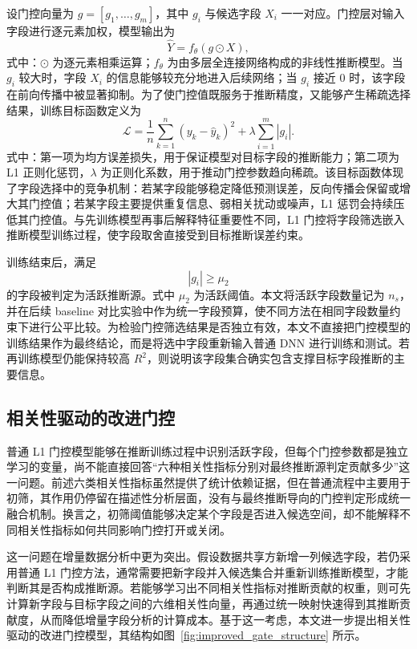 \documentclass[UTF8,zihao=5,twoside]{ctexart}
\numberwithin{equation}{section}
\begin{document}
设门控向量为 $g=[g_1,\ldots,g_m]$，其中 $g_i$ 与候选字段 $X_i$ 一一对应。门控层对输入字段进行逐元素加权，模型输出为
\begin{equation}
\hat{Y}=f_{\theta}(g\odot X),
\end{equation}
式中：$\odot$ 为逐元素相乘运算；$f_{\theta}$ 为由多层全连接网络构成的非线性推断模型。当 $g_i$ 较大时，字段 $X_i$ 的信息能够较充分地进入后续网络；当 $g_i$ 接近 0 时，该字段在前向传播中被显著抑制。为了使门控值既服务于推断精度，又能够产生稀疏选择结果，训练目标函数定义为
\begin{equation}
\mathcal{L}=\frac{1}{n}\sum_{k=1}^{n}(y_k-\hat{y}_k)^2+\lambda\sum_{i=1}^{m}|g_i|.
\end{equation}
式中：第一项为均方误差损失，用于保证模型对目标字段的推断能力；第二项为 L1 正则化惩罚，$\lambda$ 为正则化系数，用于推动门控参数趋向稀疏。该目标函数体现了字段选择中的竞争机制：若某字段能够稳定降低预测误差，反向传播会保留或增大其门控值；若某字段主要提供重复信息、弱相关扰动或噪声，L1 惩罚会持续压低其门控值。与先训练模型再事后解释特征重要性不同，L1 门控将字段筛选嵌入推断模型训练过程，使字段取舍直接受到目标推断误差约束。

训练结束后，满足
\begin{equation}
|g_i|\geq \mu_2
\end{equation}
的字段被判定为活跃推断源。式中 $\mu_2$ 为活跃阈值。本文将活跃字段数量记为 $n_s$，并在后续 baseline 对比实验中作为统一字段预算，使不同方法在相同字段数量约束下进行公平比较。为检验门控筛选结果是否独立有效，本文不直接把门控模型的训练结果作为最终结论，而是将选中字段重新输入普通 DNN 进行训练和测试。若再训练模型仍能保持较高 $R^2$，则说明该字段集合确实包含支撑目标字段推断的主要信息。

\subsection{相关性驱动的改进门控}
普通 L1 门控模型能够在推断训练过程中识别活跃字段，但每个门控参数都是独立学习的变量，尚不能直接回答“六种相关性指标分别对最终推断源判定贡献多少”这一问题。前述六类相关性指标虽然提供了统计依赖证据，但在普通流程中主要用于初筛，其作用仍停留在描述性分析层面，没有与最终推断导向的门控判定形成统一融合机制。换言之，初筛阈值能够决定某个字段是否进入候选空间，却不能解释不同相关性指标如何共同影响门控打开或关闭。

这一问题在增量数据分析中更为突出。假设数据共享方新增一列候选字段，若仍采用普通 L1 门控方法，通常需要把新字段并入候选集合并重新训练推断模型，才能判断其是否构成推断源。若能够学习出不同相关性指标对推断贡献的权重，则可先计算新字段与目标字段之间的六维相关性向量，再通过统一映射快速得到其推断贡献度，从而降低增量字段分析的计算成本。基于这一考虑，本文进一步提出相关性驱动的改进门控模型，其结构如图~\ref{fig:improved_gate_structure} 所示。
\end{document}
